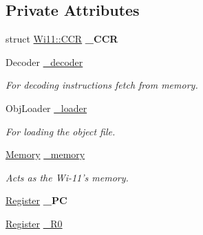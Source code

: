 \subsection*{Private Attributes}
\begin{DoxyCompactItemize}
\item 
\hypertarget{classWi11_a84cb35829890fca6122c023229007002}{
struct \hyperlink{structWi11_1_1CCR}{Wi11::CCR} {\bfseries \_\-CCR}}
\label{classWi11_a84cb35829890fca6122c023229007002}

\item 
\hypertarget{classWi11_a145d0e52ef8bfd21d7b5a0ff3fea43d1}{
Decoder \hyperlink{classWi11_a145d0e52ef8bfd21d7b5a0ff3fea43d1}{\_\-decoder}}
\label{classWi11_a145d0e52ef8bfd21d7b5a0ff3fea43d1}

\begin{DoxyCompactList}\small\item\em For decoding instructions fetch from memory. \item\end{DoxyCompactList}\item 
\hypertarget{classWi11_a22efbed824867b4f355062a31f93d8e2}{
ObjLoader \hyperlink{classWi11_a22efbed824867b4f355062a31f93d8e2}{\_\-loader}}
\label{classWi11_a22efbed824867b4f355062a31f93d8e2}

\begin{DoxyCompactList}\small\item\em For loading the object file. \item\end{DoxyCompactList}\item 
\hypertarget{classWi11_a07d3ee0573a4ea7d260574120da9dec1}{
\hyperlink{classMemory}{Memory} \hyperlink{classWi11_a07d3ee0573a4ea7d260574120da9dec1}{\_\-memory}}
\label{classWi11_a07d3ee0573a4ea7d260574120da9dec1}

\begin{DoxyCompactList}\small\item\em Acts as the Wi-\/11's memory. \item\end{DoxyCompactList}\item 
\hypertarget{classWi11_af60b1a832f564e3ac52b4edf7edc8c9a}{
\hyperlink{classRegister}{Register} {\bfseries \_\-PC}}
\label{classWi11_af60b1a832f564e3ac52b4edf7edc8c9a}

\item 
\hypertarget{classWi11_afdde77e5fbf30ef6647572f5c3050b7c}{
\hyperlink{classRegister}{Register} \hyperlink{classWi11_afdde77e5fbf30ef6647572f5c3050b7c}{\_\-R0}}
\label{classWi11_afdde77e5fbf30ef6647572f5c3050b7c}


\end{DoxyCompactItemize}
